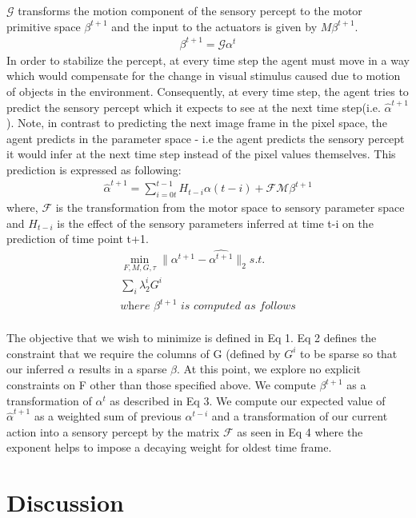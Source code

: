 \documentclass[conference]{IEEEtran}
\begin{document}
$\mathcal{G}$ transforms the motion component of the sensory percept to the motor primitive space $\beta^{t+1}$ and the input to the actuators is given by $M\beta^{t+1}$.
\begin{eqnarray*}
\beta^{t+1} = \mathcal{G} \alpha^{t}
\end{eqnarray*}
In order to stabilize the percept, at every time step the agent must move in a way which would compensate for the change in visual stimulus caused due to motion of objects in the environment. Consequently, at every time step, the agent tries to predict the sensory percept which it expects to see at the next time step(i.e. $\hat{\alpha}^{t+1}$). Note, in contrast to predicting the next image frame in the pixel space, the agent predicts in the parameter space - i.e the agent predicts the sensory percept it would infer at the next time step instead of the pixel values themselves. This prediction is expressed as following:
\begin{eqnarray*}
\hat{\alpha}^{t+1} = \sum_{i=0t}^{t-1}  H_{t-i} \alpha(t-i) + \mathcal{F}\mathcal{M}\beta^{t+1} 
\end{eqnarray*}
where, $\mathcal{F}$ is the transformation from the motor space to sensory parameter space and $H_{t-i}$ is the effect of the sensory parameters inferred at time t-i on the prediction of time point t+1.
\begin{eqnarray}
\min_{F,M,G,\tau} \| \alpha^{t+1} - \hat{\alpha^{t+1}} \|_{2} \textit{s.t.} \\ 
\sum_{i} \lambda_2^{i} G^{i}  \\
 \textit{where $\beta^{t+1}$ is computed as follows} \nonumber \\
\end{eqnarray}

The objective that we wish to minimize is defined in Eq 1. Eq 2 defines the constraint that we require the columns of G (defined by $G^{i}$ to be sparse so that our inferred $\alpha$ results in a sparse $\beta$. At this point, we explore no explicit constraints on F other than those specified above. We compute $\beta^{t+1}$ as a transformation of $\alpha^{t}$ as described in Eq 3. We compute our expected value of $\hat{\alpha}^{t+1}$ as a weighted sum of previous $\alpha^{t-i}$ and a transformation of our current action into a sensory percept by the matrix $\mathcal{F}$ as seen in Eq 4 where the exponent helps to impose a decaying weight for oldest time frame. 

\section{Discussion}
\end{document}
